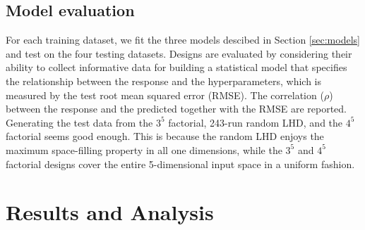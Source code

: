 \documentclass [PhD] {package/uclathes}
\begin{document}
\subsection*{{Model evaluation}}
For each training dataset, we fit the three models descibed in Section \ref{sec:models} and test on the four testing datasets.
Designs are evaluated by considering their ability to collect informative data for building a statistical model that specifies the relationship between the response and the hyperparameters, which is measured by the test root mean squared error (RMSE). The correlation ($\rho$) between the response and the predicted together with the RMSE are reported. Generating the test data from the $3^5$ factorial, 243-run random LHD, and the  $4^5$ factorial seems good enough. This is because the random LHD enjoys the maximum space-filling property in all one dimensions, while the $3^5$ and $4^5$ factorial designs cover the entire 5-dimensional input space in a uniform fashion. %

\section{Results and Analysis}

\end{document}
